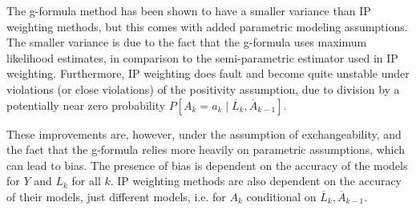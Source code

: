 The g-formula method has been shown to have a smaller variance than IP weighting methods, but this comes with added parametric modeling assumptions.\cite{young2011comparative} The smaller variance is due to the fact that the g-formula uses maximum likelihood estimates, in comparison to the semi-parametric estimator used in IP weighting. Furthermore, IP weighting does fault and become quite unstable under violations (or close violations) of the positivity assumption, due to division by a potentially near zero probability $P[A_k=a_k \mid \overline{L}_k, \overline{A}_{k-1}]$.  

These improvements are, however, under the assumption of exchangeability, and the fact that the g-formula relies more heavily on parametric assumptions, which can lead to bias.  The presence of bias is dependent on the accuracy of the models for $Y$ and $L_k$ for all $k$.  IP weighting methods are also dependent on the accuracy of their models, just different models, i.e. for $A_k$ conditional on $\overline{L}_k, \overline{A}_{k-1}$.  


